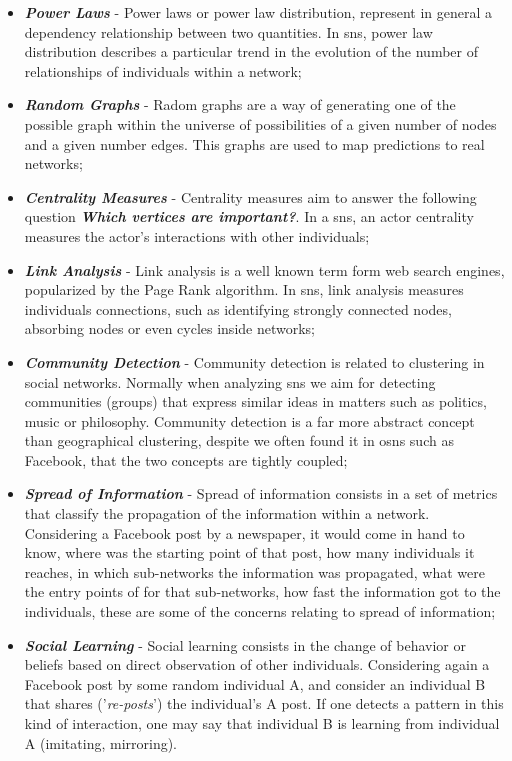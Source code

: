 \begin{itemize}
\item \textbf{\textit{Power Laws}} - Power laws or power law distribution, represent in general a dependency relationship between two quantities. In \glspl{sn}, power law distribution describes a particular trend in the evolution of the number of relationships of individuals within a network;
\item \textbf{\textit{Random Graphs}} - Radom graphs are a way of generating one of the possible graph within the universe of possibilities of a given number of nodes and a given number edges. This graphs are used to map predictions to real networks;
\item \textbf{\textit{Centrality Measures}} - Centrality measures aim to answer the following question \textit{\textbf{Which vertices are important?}}. In a \glspl{sn}, an actor centrality measures the actor's interactions with other individuals;
\item \textbf{\textit{Link Analysis}} - Link analysis is a well known term form web search engines, popularized by the Page Rank algorithm. In \glspl{sn}, link analysis measures individuals connections, such as identifying strongly connected nodes, absorbing nodes or even cycles inside networks;
\item \textbf{\textit{Community Detection}} - Community detection is related to clustering in social networks. Normally when analyzing \glspl{sn} we aim for detecting communities (groups) that express similar ideas in matters such as politics, music or philosophy. Community detection is a far more abstract concept than geographical clustering, despite we often found it in \glspl{osn} such as Facebook, that the two concepts are tightly coupled;
\item \textbf{\textit{Spread of Information}} - Spread of information consists in a set of metrics that classify the propagation of the information within a network. Considering a Facebook post by a newspaper, it would come in hand to know, where was the starting point of that post, how many individuals it reaches, in which sub-networks the information was propagated, what were the entry points of for that sub-networks, how fast the information got to the individuals, these are some of the concerns relating to spread of information;
\item \textbf{\textit{Social Learning}} - Social learning consists in the change of behavior or beliefs based on direct observation of other individuals. Considering again a Facebook post by some random individual A, and consider an individual B that shares ('\textit{re-posts}') the individual's A post. If one detects a pattern in this kind of interaction, one may say that individual B is learning from individual A (imitating, mirroring).
\end{itemize}

